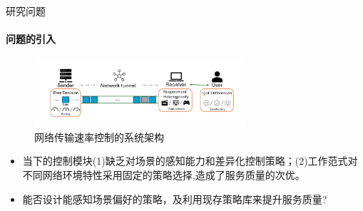 \documentclass{beamer}
\begin{document}
%                 
            

        
            
              




\begin{frame}[fragile]{研究问题}
\framesubtitle{问题的引入}
        \begin{figure} [ht]
        \centering
        \includegraphics[width=0.7\textwidth]{figures/chap01/system_archi.pdf} 
        \caption{网络传输速率控制的系统架构}
        \label{fig:teaser_system_archi}
        \end{figure} 
    
        \begin{itemize}
        \item 当下的控制模块(1)缺乏对场景的感知能力和差异化控制策略；(2)工作范式对不同网络环境特性采用固定的策略选择,造成了服务质量的次优。
        \item \alert{能否设计能感知场景偏好的策略，及利用现存策略库来提升服务质量?}
    \end{itemize}
\end{frame}
\end{document}
